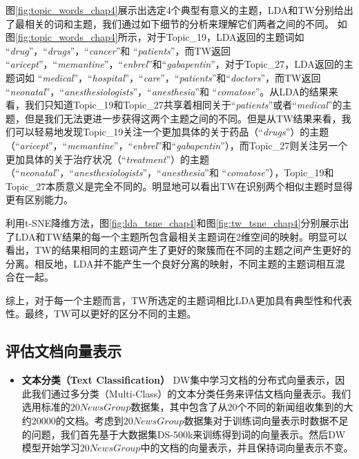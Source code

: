 \documentclass[master]{njuthesis}
\begin{document}
图\ref{fig:topic_words_chap4}展示出选定4个典型有意义的主题，LDA和TW分别给出了最相关的词和主题，我们通过如下细节的分析来理解它们两者之间的不同。
如图\ref{fig:topic_words_chap4}所示，对于Topic\_19，LDA返回的主题词如 ``{\it drug}''，``{\it drugs}''，``{\it cancer}''和 ``{\it patients}''，而TW返回 ``{\it aricept}''，``{\it memantine}''，``{\it enbrel}''和``{\it gabapentin}''，对于Topic\_27，LDA返回的主题词如 ``{\it medical}''，``{\it hospital}''，``{\it care}''，``{\it patients}''和``{\it doctors}''，而TW返回 ``{\it neonatal}''，``{\it anesthesiologists}''，``{\it anesthesia}''和 ``{\it comatose}''。从LDA的结果来看，我们只知道Topic\_19和Topic\_27共享着相同关于``{\it patients}''或者``{\it medical}''的主题，但是我们无法更进一步获得这两个主题之间的不同。但是从TW结果来看，我们可以轻易地发现Topic\_19关注一个更加具体的关于药品（``{\it drugs}''）的主题（``{\it aricept}''，``{\it memantine}''，``{\it enbrel}''和``{\it gabapentin}''），而Topic\_27则关注另一个更加具体的关于治疗状况（``{\it treatment}''）的主题（``{\it neonatal}''，``{\it anesthesiologists}''，``{\it anesthesia}''和 ``{\it comatose}''），Topic\_19和Topic\_27本质意义是完全不同的。明显地可以看出TW在识别两个相似主题时显得更有区别能力。

利用t-SNE\cite{van2008visualizing}降维方法，图\ref{fig:lda_tsne_chap4}和图\ref{fig:tw_tsne_chap4}分别展示出了LDA和TW结果的每一个主题所包含最相关主题词在2维空间的映射。明显可以看出，TW的结果相同的主题词产生了更好的聚簇而在不同的主题之间产生更好的分离。相反地，LDA并不能产生一个良好分离的映射，不同主题的主题词相互混合在一起。

综上，对于每一个主题而言，TW所选定的主题词相比LDA更加具有典型性和代表性。最终，TW可以更好的区分不同的主题。

\subsection{评估文档向量表示}\label{subsec_evaluate_doc_chap4}

\begin{itemize}
\item \textbf{文本分类（Text Classification）} DW集中学习文档的分布式向量表示，因此我们通过多分类（Multi-Class）的文本分类任务来评估文档向量表示。我们选用标准的$20NewsGroup$数据集，其中包含了从$20$个不同的新闻组收集到的大约$20000$的文档。考虑到$20NewsGroup$数据集对于训练词向量表示时数据不足的问题，我们首先基于大数据集DS-500k来训练得到词的向量表示。然后DW模型开始学习$20NewsGroup$中的文档的向量表示，并且保持词向量表示不变。

\end{itemize}
\end{document}
